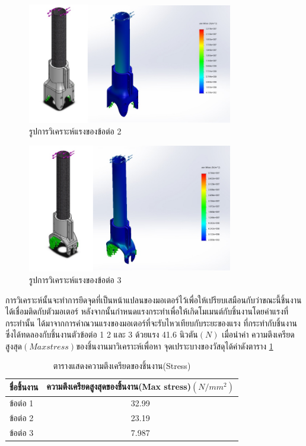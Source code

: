 \clearpage
\begin{figure}[h!]
  \centering
  \includegraphics[width=0.8\textwidth]{chapter4/images/FEA2.PNG}
  \caption{รูปการวิเคราะห์แรงของข้อต่อ 2}
  \label{fig:FEAjoint2}
\end{figure}

\begin{figure}[h!]
  \centering
  \includegraphics[width=0.8\textwidth]{chapter4/images/FEA3.PNG}
  \caption{รูปการวิเคราะห์แรงของข้อต่อ 3}
  \label{fig:FEAjoint3}
\end{figure}
\clearpage

การวิเคราะห์นั้นจะทำการยึดจุดที่เป็นหน้าแปลนของมอเตอร์ไว้เพื่อให้เปรียบเสมือนกับว่าขณะนี้ชิ้นงาน
ได้เชื่อมติดกับตัวมอเตอร์ หลังจากนั้นกำหนดแรงกระทำเพื่อให้เกิดโมเมนต์กับชิ้นงานโดยค่าแรงที่กระทำนั้น
ได้มาจากการคำณวนแรงของมอเตอร์ที่จะรับไหวเทียบกับระยะของแรง ที่กระทำกับชิ้นงาน 
ซึ่งได้ทดลองกับชิ้นงานตัวข้อต่อ 1 2 และ 3 ด้วยแรง 41.6 นิวตัน$(N)$
เมื่อนำค่า ความตึงเครียดสูงสุด$(Max stress)$ของชิ้นงานมาวิเคราะห์เพื่อหา จุดเปราะบางของวัสดุได้ค่าดังตาราง
\ref{tab:streaa_result}
\begin{table}[ht]
	\centering
	\begin{tabular}{| l | c |}
		\hline
		ชื่อชิ้นงาน	& ความตึงเครียดสูงสุดของชิ้นงาน(Max stress)$(N/mm^2)$ \\
        \hline
        ข้อต่อ 1 & 32.99 \\
        ข้อต่อ 2 & 23.19 \\
        ข้อต่อ 3 & 7.987 \\
	    \hline
	\end{tabular}
	\caption{ตารางแสดงความตึงเครียดของชิ้นงาน(Stress)}
	\label{tab:streaa_result}
\end{table}

